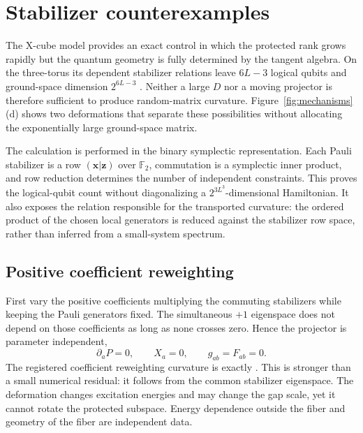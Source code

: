 \section{Stabilizer counterexamples}
\label{sec:stabilizer}

The X-cube model provides an exact control in which the protected rank grows
rapidly but the quantum geometry is fully determined by the tangent algebra.
On the three-torus its dependent stabilizer relations leave $6L-3$ logical
qubits and ground-space dimension $2^{6L-3}$
\cite{vijay2016xcube}.  Neither a large $D$ nor a moving projector is therefore
sufficient to produce random-matrix curvature.  Figure~\ref{fig:mechanisms}(d)
shows two deformations that separate these possibilities without allocating
the exponentially large ground-space matrix.

The calculation is performed in the binary symplectic representation.  Each
Pauli stabilizer is a row $(\bm x|\bm z)$ over $\mathbb F_2$, commutation is a
symplectic inner product, and row reduction determines the number of
independent constraints.  This proves the logical-qubit count without
diagonalizing a $2^{3L^3}$-dimensional Hamiltonian.  It also exposes the
relation responsible for the transported curvature: the ordered product of
the chosen local generators is reduced against the stabilizer row space,
rather than inferred from a small-system spectrum.

\subsection{Positive coefficient reweighting}

First vary the positive coefficients multiplying the commuting stabilizers
while keeping the Pauli generators fixed.  The simultaneous $+1$ eigenspace
does not depend on those coefficients as long as none crosses zero.  Hence the
projector is parameter independent,
\begin{equation}
 \partial_aP=0,
 \qquad X_a=0,
 \qquad g_{ab}=F_{ab}=0.
 \label{eq:xcube-flat-control}
\end{equation}
The registered coefficient reweighting curvature is exactly
\XCubeCoefficientCurvature.  This is stronger than a small numerical
residual: it follows from the common stabilizer eigenspace.  The deformation
changes excitation energies and may change the gap scale, yet it cannot
rotate the protected subspace.  Energy dependence outside the fiber and
geometry of the fiber are independent data.

